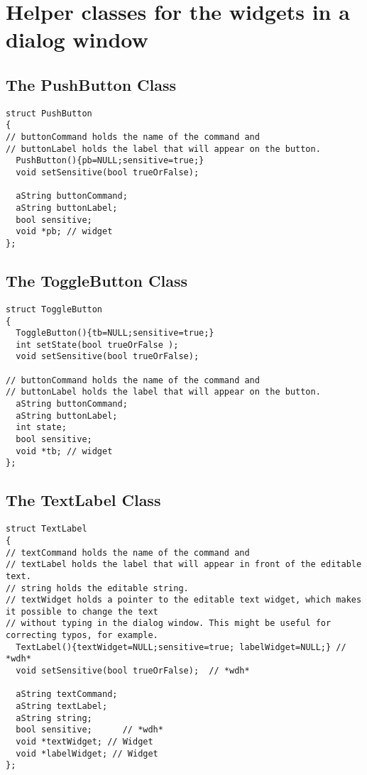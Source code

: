 \documentclass{article}
\begin{document}
\section{Helper classes for the widgets in a dialog window}
\subsection{The PushButton Class} \label{sec:push-button}
\begin{verbatim}
struct PushButton
{
// buttonCommand holds the name of the command and 
// buttonLabel holds the label that will appear on the button.
  PushButton(){pb=NULL;sensitive=true;} 
  void setSensitive(bool trueOrFalse);  

  aString buttonCommand;
  aString buttonLabel;
  bool sensitive;
  void *pb; // widget
};
\end{verbatim}


\subsection{The ToggleButton Class}
\begin{verbatim}
struct ToggleButton
{
  ToggleButton(){tb=NULL;sensitive=true;} 
  int setState(bool trueOrFalse ); 
  void setSensitive(bool trueOrFalse);  

// buttonCommand holds the name of the command and 
// buttonLabel holds the label that will appear on the button.
  aString buttonCommand;
  aString buttonLabel;
  int state;
  bool sensitive;      
  void *tb; // widget
};
\end{verbatim}


\subsection{The TextLabel Class}
\begin{verbatim}
struct TextLabel
{
// textCommand holds the name of the command and 
// textLabel holds the label that will appear in front of the editable text.
// string holds the editable string.
// textWidget holds a pointer to the editable text widget, which makes it possible to change the text
// without typing in the dialog window. This might be useful for correcting typos, for example.
  TextLabel(){textWidget=NULL;sensitive=true; labelWidget=NULL;} // *wdh*
  void setSensitive(bool trueOrFalse);  // *wdh*

  aString textCommand;
  aString textLabel;
  aString string;
  bool sensitive;      // *wdh*
  void *textWidget; // Widget
  void *labelWidget; // Widget
};
\end{verbatim}

\end{document}
